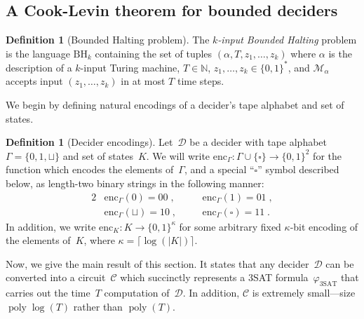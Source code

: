 \documentclass[11pt]{article}
\theoremstyle{definition}
\newtheorem{definition}[theorem]{Definition}
\newcommand{\N}{\ensuremath{\mathbb{N}}}
\DeclareMathOperator{\poly}{poly}
\newcommand{\decider}{\mathcal{D}}
\renewcommand{\cal}[1]{\mathcal{#1}}
\newcommand{\BoundedHalting}{\mathrm{BH}}
\newcommand{\circuit}{\mathcal{C}}
\begin{document}
\subsection{A Cook-Levin theorem for bounded deciders}
\label{sec:cook-levin}





\begin{definition}[Bounded Halting problem]
	The \emph{$k$-input Bounded Halting} problem is the language
  $\BoundedHalting_k$ containing the set of tuples $(\alpha, T, z_1,\ldots,z_k)$
  where $\alpha$ is the description of a $k$-input Turing machine, $T \in \N$,
  $z_1, \ldots, z_k \in \{0,1\}^*$, and $\cal{M}_\alpha$ accepts input $(z_1,
  \ldots, z_k)$ in at most $T$ time steps.
\end{definition}

We begin by defining natural encodings of a decider's tape alphabet and set of
states.

\begin{definition}[Decider encodings]
  Let~$\decider$ be a decider with tape alphabet $\Gamma = \{0, 1, \sqcup\}$ and
  set of states~$K$.
  We will write $\mathrm{enc}_{\Gamma}: \Gamma \cup \{\square\} \rightarrow \{0,
  1\}^2$ for the function which encodes the elements of~$\Gamma$, and a special
  ``$\square$'' symbol described below, as length-two binary strings in the
  following manner:
  \begin{alignat*}{2}
    & \mathrm{enc}_{\Gamma}(0) = 00\;,\quad
    && \mathrm{enc}_{\Gamma}(1) = 01\;,\\
    & \mathrm{enc}_{\Gamma}(\sqcup) = 10\;,\quad
    && \mathrm{enc}_{\Gamma}(\square) = 11\;.
  \end{alignat*}
  In addition, we write $\mathrm{enc}_K : K \rightarrow \{0, 1\}^\kappa$ for
  some arbitrary fixed $\kappa$-bit encoding of the elements of~$K$, where
  $\kappa = \lceil \log(|K|) \rceil$.
\end{definition}

Now, we give the main result of this section.
It states that any decider~$\decider$ can be converted into a circuit~$\circuit$
which succinctly represents a 3SAT formula~$\varphi_{\mathrm{3SAT}}$ that
carries out the time~$T$ computation of~$\decider$.
In addition, $\circuit$ is extremely small---size $\poly \log(T)$ rather than
$\poly(T)$.
\end{document}
